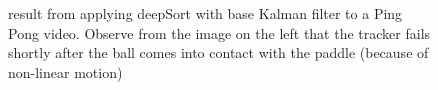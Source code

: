 \documentclass[10pt,twocolumn,letterpaper]{article}
\begin{document}
\begin{figure}[h]
  \centering
    \qquad
    \caption{result from applying deepSort with base Kalman filter to a Ping Pong video. Observe from the image on the left that the tracker fails shortly after the ball comes into contact with the paddle (because of non-linear motion)}%
\end{figure}
\end{document}
